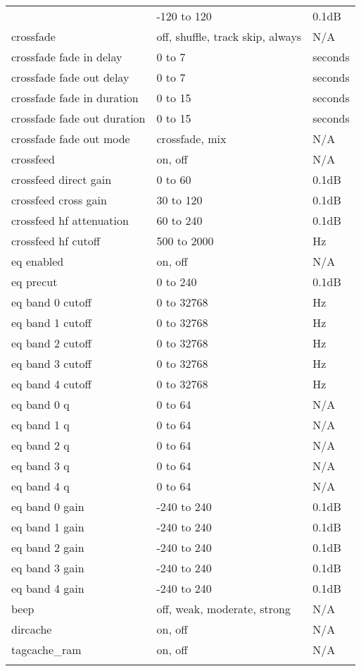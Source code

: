 \begin{center}
\begin{longtable}{@{}lll@{}}
{      replaygain preamp & -120 to 120 & 0.1dB\\
%
      crossfade & off, shuffle, track skip, always & N/A\\
      crossfade fade in delay & 0 to 7 & seconds\\
      crossfade fade out delay & 0 to 7 & seconds\\
      crossfade fade in duration & 0 to 15 & seconds\\
      crossfade fade out duration & 0 to 15 & seconds\\
      crossfade fade out mode & crossfade, mix & N/A\\
%
      crossfeed & on, off & N/A\\
      crossfeed direct gain & 0 to 60 & 0.1dB\\
      crossfeed cross gain & 30 to 120 & 0.1dB\\
      crossfeed hf attenuation & 60 to 240 & 0.1dB\\
      crossfeed hf cutoff & 500 to 2000 & Hz\\
%
      eq enabled & on, off & N/A\\
      eq precut& 0 to 240 & 0.1dB\\
      eq band 0 cutoff & 0 to 32768 & Hz\\
      eq band 1 cutoff & 0 to 32768 & Hz\\
      eq band 2 cutoff & 0 to 32768 & Hz\\
      eq band 3 cutoff & 0 to 32768 & Hz\\
      eq band 4 cutoff & 0 to 32768 & Hz\\
      eq band 0 q & 0 to 64 & N/A\\
      eq band 1 q & 0 to 64 & N/A\\
      eq band 2 q & 0 to 64 & N/A\\
      eq band 3 q & 0 to 64 & N/A\\
      eq band 4 q & 0 to 64 & N/A\\
      eq band 0 gain & -240 to 240 & 0.1dB\\
      eq band 1 gain & -240 to 240 & 0.1dB\\
      eq band 2 gain & -240 to 240 & 0.1dB\\
      eq band 3 gain & -240 to 240 & 0.1dB\\
      eq band 4 gain & -240 to 240 & 0.1dB\\
%
      beep & off, weak, moderate, strong & N/A\\
      dircache & on, off & N/A\\
      tagcache\_ram & on, off & N/A\\
    }%


\end{longtable}
\end{center}
